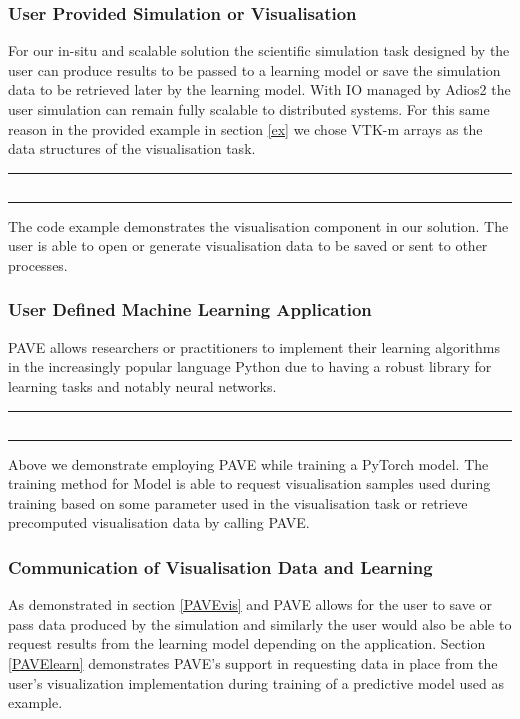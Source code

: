 \documentclass[conference]{IEEEtran}
\begin{document}
\subsubsection{User Provided Simulation or Visualisation}

For our in-situ and scalable solution the scientific simulation task designed by the user can produce results to be passed to a learning model or save the simulation data to be retrieved later by the learning model. With IO managed by Adios2 the user simulation can remain fully scalable to distributed systems. For this same reason in the provided example in section \ref{ex} we chose VTK-m arrays as the data structures of the visualisation task.
\noindent\rule{0.5\textwidth}{1pt}
\inputminted{cpp}{pave_pt.py}\label{PAVEvis}
\noindent\rule{0.5\textwidth}{1pt}

The code example  demonstrates the visualisation component in our solution. The user is able to open or generate visualisation data to be saved or sent to other processes. 

\subsubsection{User Defined Machine Learning Application}

PAVE allows researchers or practitioners to implement their learning algorithms in the increasingly popular language Python due to having a robust library for learning tasks and notably neural networks. 

\noindent\rule{0.5\textwidth}{1pt}\label{PAVElearn}
\inputminted{python}{pave.py}
\noindent\rule{0.5\textwidth}{1pt}

Above we demonstrate employing PAVE while training a PyTorch model. The training method for Model is able to request visualisation samples used during training based on some parameter used in the visualisation task or retrieve precomputed visualisation data by calling PAVE.
 
\subsubsection{Communication of Visualisation Data and Learning}

As demonstrated in section \ref{PAVEvis} and PAVE allows for the user to save or pass data produced by the simulation and similarly the user would also be able to request results from the learning model depending on the application. Section \ref{PAVElearn} demonstrates PAVE's support in requesting data in place from the user's visualization implementation during training of a predictive model used as example. 
\end{document}
